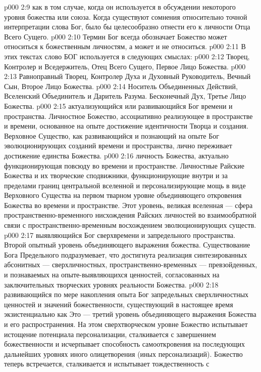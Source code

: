\vs p000 2:9  как в том случае, когда он используется в обсуждении некоторого уровня божества или союза. Когда существуют сомнения относительно точной интерпретации слова Бог, было бы целесообразно отнести его к личности Отца Всего Сущего.
\vs p000 2:10 \pc Термин Бог всегда обозначает  Божество может относиться к божественным личностям, а может и не относиться.
\vs p000 2:11 \pc В этих текстах слово БОГ используется в следующих смыслах:
\vs p000 2:12 \bibnobreakspace {} Творец, Контролер и Вседержитель, Отец Всего Сущего, Первое Лицо Божества.
\vs p000 2:13 \bibnobreakspace {} Равноправный Творец, Контролер Духа и Духовный Руководитель, Вечный Сын, Второе Лицо Божества.
\vs p000 2:14 \bibnobreakspace {} Носитель Объединенных Действий, Вселенский Объединитель и Даритель Разума. Бесконечный Дух, Третье Лицо Божества.
\vs p000 2:15 \bibnobreakspace {} актуализующийся или развивающийся Бог времени и пространства. Личностное Божество, ассоциативно реализующее в пространстве и времени, основанное на опыте достижение идентичности Творца и создания. Верховное Существо, как развивающийся и познающий на опыте Бог эволюционирующих созданий времени и пространства, лично переживает достижение единства Божества.
\vs p000 2:16 \bibnobreakspace {} личность Божества, актуально функционирующая повсюду во времени и пространстве. Личностные Райские Божества и их творческие сподвижники, функционирующие внутри и за пределами границ центральной вселенной и персонализирующие мощь в виде Верховного Существа на первом тварном уровне объединяющего откровения Божества во времени и пространстве. Этот уровень, великая вселенная --- сфера пространственно\hyp{}временного нисхождения Райских личностей во взаимообратной связи с пространственно\hyp{}временным восхождением эволюционирующих существ.
\vs p000 2:17 \bibnobreakspace {} выявляющийся Бог сверхвремени и запредельного пространства. Второй опытный уровень объединяющего выражения божества. Существование Бога Предельного подразумевает, что достигнута реализация синтезированных абсонитных --- сверхличностных, пространственно\hyp{}временных --- превзойденных, и познаваемых на опыте\hyp{}выявляющихся ценностей, согласованных на заключительных творческих уровнях реальности Божества.
\vs p000 2:18 \bibnobreakspace {} развивающийся по мере накопления опыта Бог запредельных сверхличностных ценностей и значений божественности, существующий в настоящее время экзистенциально как  Это --- третий уровень объединяющего выражения Божества и его распространения. На этом сверхтворческом уровне Божество испытывает истощение потенциала персонализации, сталкивается с завершением божественности и исчерпывает способность самооткровения на последующих дальнейших уровнях иного олицетворения (иных персонализаций). Божество теперь встречается, сталкивается и испытывает тождественность с 
